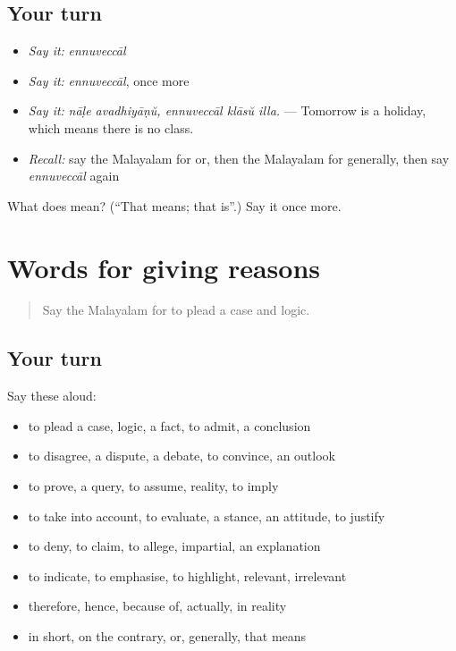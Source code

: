 \subsection*{Your turn}
\begin{itemize}
\raggedright
  \item \emph{Say it:} \emph{ennuveccāl}
  \item \emph{Say it:} \emph{ennuveccāl}, once more
  \item \emph{Say it:} \emph{nāḷe avadhiyāṇŭ, ennuveccāl klāsŭ illa.} — Tomorrow is a holiday, which means there is no class.
  \item \emph{Recall:} say the Malayalam for or, then the Malayalam for generally, then say \emph{ennuveccāl} again
\end{itemize}

\begin{tcolorbox}[breakable,colback=teal!4,colframe=teal!35!black,title={Before you move on}]
What does  mean? (\textquotedblleft{}That means; that is\textquotedblright{}.) Say it once more.
\end{tcolorbox}
\section[(dialogue)]{Words for giving reasons}

\label{lesson:ML-R412-review-405-412}



\begin{quote}
Say the Malayalam for to plead a case and logic.
\end{quote}

\subsection*{Your turn}
Say these aloud:

\begin{itemize}
\raggedright
  \item to plead a case, logic, a fact, to admit, a conclusion
  \item to disagree, a dispute, a debate, to convince, an outlook
  \item to prove, a query, to assume, reality, to imply
  \item to take into account, to evaluate, a stance, an attitude, to justify
  \item to deny, to claim, to allege, impartial, an explanation
  \item to indicate, to emphasise, to highlight, relevant, irrelevant
  \item therefore, hence, because of, actually, in reality
  \item in short, on the contrary, or, generally, that means
\end{itemize}

